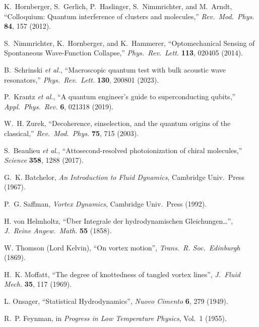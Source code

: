 \documentclass[11pt]{article}
\begin{document}
	\begin{thebibliography}{99}

		K.~Hornberger, S.~Gerlich, P.~Haslinger, S.~Nimmrichter, and M.~Arndt,
		``Colloquium: Quantum interference of clusters and molecules,''
		\emph{Rev.\ Mod.\ Phys.} \textbf{84}, 157 (2012).

		S.~Nimmrichter, K.~Hornberger, and K.~Hammerer,
		``Optomechanical Sensing of Spontaneous Wave-Function Collapse,''
		\emph{Phys.\ Rev.\ Lett.} \textbf{113}, 020405 (2014).

		B.~Schrinski \emph{et al.},
		``Macroscopic quantum test with bulk acoustic wave resonators,''
		\emph{Phys.\ Rev.\ Lett.} \textbf{130}, 200801 (2023).

		P.~Krantz \emph{et al.},
		``A quantum engineer’s guide to superconducting qubits,''
		\emph{Appl.\ Phys.\ Rev.} \textbf{6}, 021318 (2019).

		W.~H. Zurek,
		``Decoherence, einselection, and the quantum origins of the classical,''
		\emph{Rev.\ Mod.\ Phys.} \textbf{75}, 715 (2003).

		S.~Beaulieu \emph{et al.},
		``Attosecond-resolved photoionization of chiral molecules,''
		\emph{Science} \textbf{358}, 1288 (2017).

		G.~K. Batchelor, \emph{An Introduction to Fluid Dynamics}, Cambridge Univ.\ Press (1967).

		P.~G. Saffman, \emph{Vortex Dynamics}, Cambridge Univ.\ Press (1992).

		H. von Helmholtz, ``\"Uber Integrale der hydrodynamischen Gleichungen\dots'', \emph{J.\ Reine Angew.\ Math.} \textbf{55} (1858).

		W. Thomson (Lord Kelvin), ``On vortex motion'', \emph{Trans.\ R. Soc.\ Edinburgh} (1869).

		H.~K. Moffatt, ``The degree of knottedness of tangled vortex lines'', \emph{J.\ Fluid Mech.} \textbf{35}, 117 (1969).

		L. Onsager, ``Statistical Hydrodynamics'', \emph{Nuovo Cimento} \textbf{6}, 279 (1949).

		R.~P. Feynman, in \emph{Progress in Low Temperature Physics}, Vol.~1 (1955).


\end{thebibliography}
\end{document}
